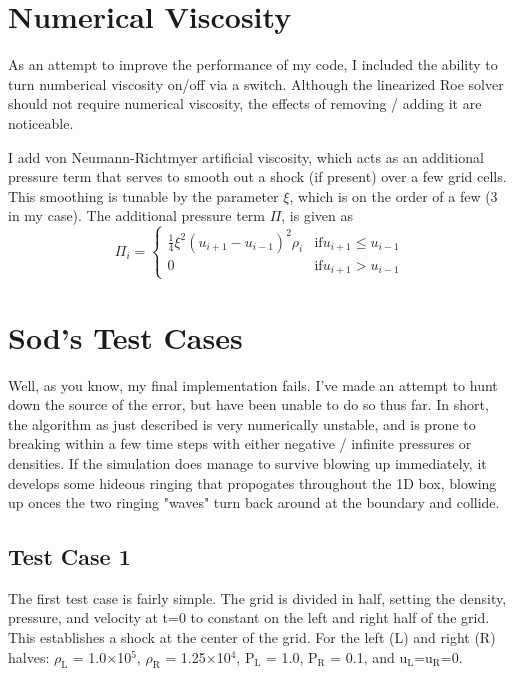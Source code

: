 \documentclass{article}
\begin{document}
\section{Numerical Viscosity}
As an attempt to improve the performance of my code, I included the ability
to turn numberical viscosity on/off via a switch. Although the linearized
Roe solver should not require numerical viscosity, the effects of removing / 
adding it are noticeable.

I add von Neumann-Richtmyer artificial viscosity, which acts as an additional
pressure term that serves to smooth out a shock (if present) over a few grid
cells. This smoothing is tunable by the parameter $\xi$, which is on the order
of a few (3 in my case). The additional pressure term $\Pi$, is given as
\[
\Pi_i =
    \begin{cases}
    \frac{1}{4} \xi^{2} \left(u_{i+1} - u_{i-1} \right)^{2} \rho_{i}
    & \text{if} u_{i+1} \le u_{i-1}\\
    0 & \text{if} u_{i+1} > u_{i-1}   
    \end{cases}
\]

\section{Sod's Test Cases}
Well, as you know, my final implementation fails. I've made an attempt to 
hunt down the source of the error, but have been unable to do so thus far. In
short, the algorithm as just described is very numerically unstable, and is 
prone to breaking within a few time steps with either negative / infinite 
pressures or densities. If the simulation does manage to survive blowing up
immediately, it develops some hideous ringing that propogates throughout the 
1D box, blowing up onces the two ringing "waves" turn back around at the
boundary and collide.

\subsection{Test Case 1}
The first test case is fairly simple. The grid is divided in half, setting the 
density, pressure, and velocity at t=0 to constant on the left and right half
of the grid. This establishes a shock at the center of the grid. For the 
left (L) and right (R) halves: $\rho_{\text{L}}$ = 1.0$\times$10$^{5}$, 
$\rho_{\text{R}}$ = 1.25$\times$10$^{4}$, P$_{\text{L}}$ = 1.0, P$_{\text{R}}$ = 0.1, and
u$_{\text{L}}$=u$_{\text{R}}$=0.
\end{document}
